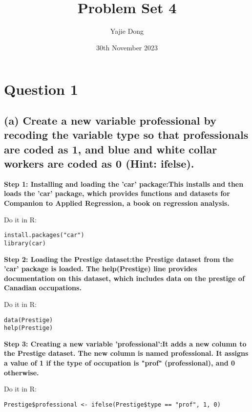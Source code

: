 \documentclass[12pt]{article}
\title{Problem Set 4}
\author{Yajie Dong}
\date{30th November 2023}
\begin{document}
\maketitle

\section{Question 1}
\subsection{(a) Create a new variable professional by recoding the variable type so that professionals
are coded as 1, and blue and white collar workers are coded as 0 (Hint: ifelse).}

\textbf{Step 1: Installing and loading the 'car' package:This installs and then loads the 'car' package, which provides functions and datasets for Companion to Applied Regression, a book on regression analysis.}

Do it in R:
\begin{lstlisting}
install.packages("car")
library(car)
\end{lstlisting}

\textbf{Step 2: Loading the Prestige dataset:the Prestige dataset from the 'car' package is loaded. The help(Prestige) line provides documentation on this dataset, which includes data on the prestige of Canadian occupations.}

Do it in R:
\begin{lstlisting}
data(Prestige)
help(Prestige)
\end{lstlisting}


\textbf{Step 3: Creating a new variable 'professional':It adds a new column to the Prestige dataset. The new column is named professional. It assigns a value of 1 if the type of occupation is "prof" (professional), and 0 otherwise.}

Do it in R:

\lstset{style=mystyle}
\begin{lstlisting}
Prestige$professional <- ifelse(Prestige$type == "prof", 1, 0)
\end{lstlisting}

 
\end{document}
